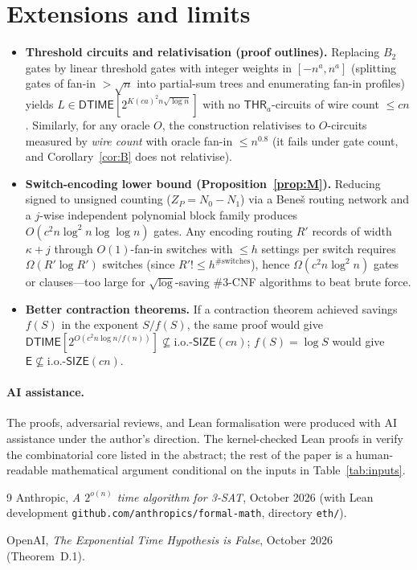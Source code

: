 \documentclass[11pt]{article}
\theoremstyle{definition}
\newcommand{\DTIME}{\mathsf{DTIME}}
\newcommand{\SIZE}{\mathsf{SIZE}}
\newcommand{\E}{\mathsf{E}}
\newcommand{\THR}{\mathsf{THR}}
\newcommand{\leanus}{\textunderscore\allowbreak}
\newcommand{\lean}[1]{\ifmmode\text{\ttfamily #1}\else{\ttfamily\let\_\leanus #1}\fi}
\begin{document}
\section{Extensions and limits}\label{sec:ext}

\begin{itemize}
\item \textbf{Threshold circuits and relativisation (proof outlines).} Replacing $B_2$ gates by linear threshold gates with integer weights in $[-n^a,n^a]$ (splitting gates of fan-in $>\sqrt{n}$ into partial-sum trees and enumerating fan-in profiles) yields $L\in\DTIME[2^{K(ca)^2 n\sqrt{\log n}}]$ with no $\THR_a$-circuits of wire count $\le cn$. Similarly, for any oracle $O$, the construction relativises to $O$-circuits measured by \emph{wire count} with oracle fan-in $\le n^{0.8}$ (it fails under gate count, and Corollary~\ref{cor:B} does not relativise).
\item \textbf{Switch-encoding lower bound (Proposition~\ref{prop:M}).} Reducing signed to unsigned counting ($Z_P=N_0-N_1$) via a Bene\v{s} routing network and a $j$-wise independent polynomial block family produces $O(c^2 n\log^2 n\log\log n)$ gates. Any encoding routing $R'$ records of width $\kappa+j$ through $O(1)$-fan-in switches with $\le h$ settings per switch requires $\Omega(R'\log R')$ switches (since $R'!\le h^{\#\text{switches}}$), hence $\Omega(c^2 n\log^2 n)$ gates or clauses---too large for $\sqrt{\log}$-saving $\#3$-CNF algorithms to beat brute force.
\item \textbf{Better contraction theorems.} If a contraction theorem achieved savings $f(S)$ in the exponent $S/f(S)$, the same proof would give $\DTIME[2^{O(c^2 n\log n/f(n))}]\not\subseteq\mathrm{i.o.}\text{-}\SIZE(cn)$; $f(S)=\log S$ would give $\E\not\subseteq\mathrm{i.o.}\text{-}\SIZE(cn)$.
\end{itemize}

\paragraph{AI assistance.}
The proofs, adversarial reviews, and Lean formalisation were produced with AI assistance under the author's direction. The kernel-checked Lean proofs in \lean{PastaMath/FastDiag/} verify the combinatorial core listed in the abstract; the rest of the paper is a human-readable mathematical argument conditional on the inputs in Table~\ref{tab:inputs}.

\begin{thebibliography}{9}
Anthropic, \emph{A $2^{o(n)}$ time algorithm for 3-SAT}, October 2026 (with Lean development \texttt{github.com/anthropics/formal-math}, directory \texttt{eth/}).

OpenAI, \emph{The Exponential Time Hypothesis is False}, October 2026 (Theorem~D.1).
\end{thebibliography}
\end{document}
